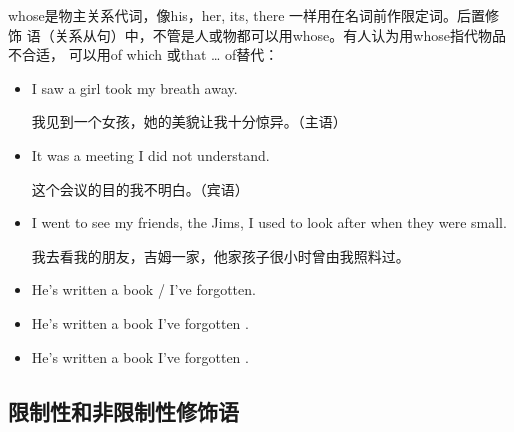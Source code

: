 whose是物主关系代词，像his，her, its, there 一样用在名词前作限定词。后置修饰
语（关系从句）中，不管是人或物都可以用whose。有人认为用whose指代物品不合适，
可以用of which 或that \ldots{} of替代：
\begin{itemize}
\item I saw a girl  took my breath away.

  我见到一个女孩，她的美貌让我十分惊异。（主语）

\item It was a meeting  I did not understand.

  这个会议的目的我不明白。（宾语）


\item I went to see my friends, the Jims,  I used to
  look after when they were small.

  我去看我的朋友，吉姆一家，他家孩子很小时曾由我照料过。


\item He's written a book / I've forgotten.
\item He's written a book  I've forgotten .
\item He's written a book  I've forgotten .
\end{itemize}


\subsection{限制性和非限制性修饰语}

